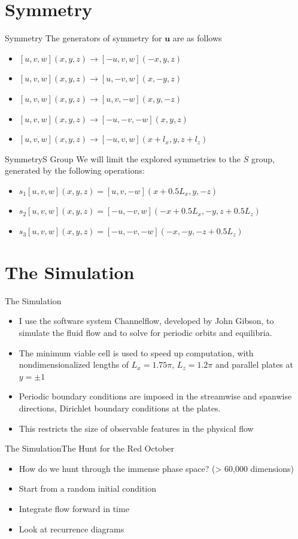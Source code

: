 \documentclass[10pt]{beamer}
\newcommand{\Vector}[1]{\mathbf{#1}}
\begin{document}
\section{Symmetry}
\begin{frame}{Symmetry}
The generators of symmetry for $\Vector{u}$ are as follows
\begin{itemize}
\item<1-> $[ u,v,w ](x,y,z) \rightarrow [-u, v, w](-x,y,z)$
\item<2-> $[ u,v,w ](x,y,z) \rightarrow [u, -v, w](x,-y,z)$
\item<3-> $[ u,v,w ](x,y,z) \rightarrow [u, v, -w](x,y,-z)$
\item<4-> $[ u,v,w ](x,y,z) \rightarrow [-u,-v, -w](x,y,z)$
\item<5-> $[ u,v,w ](x,y,z) \rightarrow [-u, v, w](x+l_x,y,z+l_z)$
\end{itemize}
\end{frame}
\begin{frame}{Symmetry}{S Group}
We will limit the explored symmetries to the $S$ group, generated by the following operations:
\begin{itemize}
\item<1-> $s_1[ u,v,w ](x,y,z) =  [u, v, -w](x+0.5L_x,y,-z)$
\item<2-> $s_2[ u,v,w ](x,y,z) =  [-u,-v, w](-x+0.5L_x,-y,z+0.5L_z)$
\item<3-> $s_3[ u,v,w ](x,y,z) =  [-u, -v, -w](-x,-y,-z+0.5L_z)$
\end{itemize}
\end{frame}
\section{The Simulation}
\begin{frame}{The Simulation}
\begin{itemize}
\item<1-> I use the software system Channelflow, developed by John Gibson, to simulate the fluid flow and to solve for periodic orbits and equilibria. 
\item<1-> The minimum viable cell is used to speed up computation, with nondimensionalized lengths of $L_x = 1.75\pi$, $L_z = 1.2\pi$ and parallel plates at $y=\pm 1$
\item<2-> Periodic boundary conditions are imposed in the streamwise and spanwise directions, Dirichlet boundary conditions at the plates.
\item<3-> This restricts the size of observable features in the physical flow
\end{itemize}
\end{frame}
\begin{frame}{The Simulation}{The Hunt for the Red October}
\begin{itemize}
\item<1-> How do we hunt through the immense phase space? (> 60,000 dimensions)
\item<2-> Start from a random initial condition
\item<3-> Integrate flow forward in time
\item<4-> Look at recurrence diagrams
\end{itemize}
\end{frame}
\end{document}
